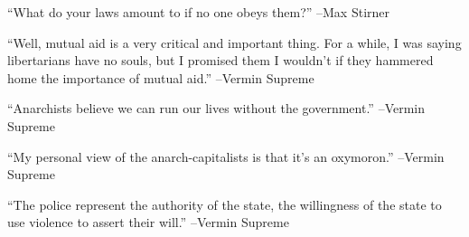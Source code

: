 \documentclass{article}%
\begin{document}
\linebreak%
\vspace{1mm}%
\begin{minipage}{\textwidth}%
\flushleft%
“What do your laws amount to if no one obeys them?”%
\linebreak%
\vspace{1mm}%
–Max Stirner%
\linebreak%
\vspace{1mm}%
\end{minipage}%
\linebreak%
\vspace{1mm}%
\begin{minipage}{\textwidth}%
\flushleft%
“Well, mutual aid is a very critical and important thing. For a while, I was saying libertarians have no souls, but I promised them I wouldn't if they hammered home the importance of mutual aid.”%
\linebreak%
\vspace{1mm}%
–Vermin Supreme%
\linebreak%
\vspace{1mm}%
\end{minipage}%
\linebreak%
\vspace{1mm}%
\begin{minipage}{\textwidth}%
\flushleft%
“Anarchists believe we can run our lives without the government.”%
\linebreak%
\vspace{1mm}%
–Vermin Supreme%
\linebreak%
\vspace{1mm}%
\end{minipage}%
\linebreak%
\vspace{1mm}%
\begin{minipage}{\textwidth}%
\flushleft%
“My personal view of the anarch{-}capitalists is that it's an oxymoron.”%
\linebreak%
\vspace{1mm}%
–Vermin Supreme%
\linebreak%
\vspace{1mm}%
\end{minipage}%
\linebreak%
\vspace{1mm}%
\begin{minipage}{\textwidth}%
\flushleft%
“The police represent the authority of the state, the willingness of the state to use violence to assert their will.”%
\linebreak%
\vspace{1mm}%
–Vermin Supreme%
\linebreak%
\vspace{1mm}%
\end{minipage}%
\end{document}
